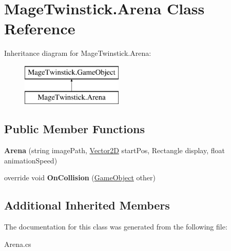 \hypertarget{class_mage_twinstick_1_1_arena}{}\section{Mage\+Twinstick.\+Arena Class Reference}
\label{class_mage_twinstick_1_1_arena}
Inheritance diagram for Mage\+Twinstick.\+Arena\+:\begin{figure}[H]
\begin{center}
\leavevmode
\includegraphics[height=2.000000cm]{class_mage_twinstick_1_1_arena}
\end{center}
\end{figure}
\subsection*{Public Member Functions}
\begin{DoxyCompactItemize}
\item 
\hypertarget{class_mage_twinstick_1_1_arena_aace14406dc02031e9739a08e5be7301b}{}{\bfseries Arena} (string image\+Path, \hyperlink{class_mage_twinstick_1_1_vector2_d}{Vector2\+D} start\+Pos, Rectangle display, float animation\+Speed)\label{class_mage_twinstick_1_1_arena_aace14406dc02031e9739a08e5be7301b}

\item 
\hypertarget{class_mage_twinstick_1_1_arena_a12cdc5acc58ee006eb0b5a47507934fc}{}override void {\bfseries On\+Collision} (\hyperlink{class_mage_twinstick_1_1_game_object}{Game\+Object} other)\label{class_mage_twinstick_1_1_arena_a12cdc5acc58ee006eb0b5a47507934fc}

\end{DoxyCompactItemize}
\subsection*{Additional Inherited Members}


The documentation for this class was generated from the following file\+:\begin{DoxyCompactItemize}
\item 
Arena.\+cs\end{DoxyCompactItemize}
